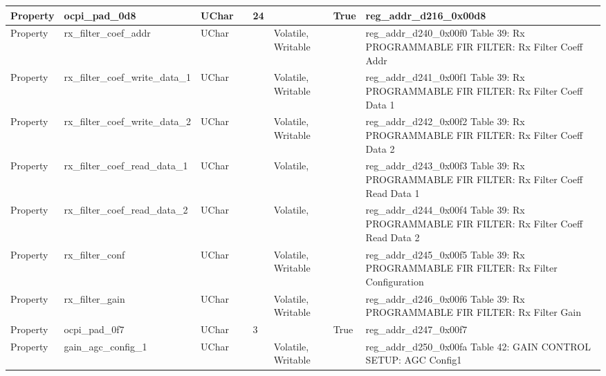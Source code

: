 \documentclass{article}
\begin{document}
\begin{scriptsize}
\begin{longtable}{|p{2cm}|p{5cm}|p{1cm}|p{2cm}|p{2cm}|p{1.75cm}|p{1.5cm}|p{5.1cm}|}
  \hline
  Property & ocpi\_pad\_0d8                                           & UChar &                  & 24               &                     & True    & reg\_addr\_d216\_0x00d8 \\
  \hline
  Property & rx\_filter\_coef\_addr                                   & UChar &                  &                  & Volatile,  Writable &         & reg\_addr\_d240\_0x00f0 Table 39: Rx PROGRAMMABLE FIR FILTER: Rx Filter Coeff Addr \\
  \hline
  Property & rx\_filter\_coef\_write\_data\_1                         & UChar &                  &                  & Volatile,  Writable &         & reg\_addr\_d241\_0x00f1 Table 39: Rx PROGRAMMABLE FIR FILTER: Rx Filter Coeff Data 1 \\
  \hline
  Property & rx\_filter\_coef\_write\_data\_2                         & UChar &                  &                  & Volatile,  Writable &         & reg\_addr\_d242\_0x00f2 Table 39: Rx PROGRAMMABLE FIR FILTER: Rx Filter Coeff Data 2 \\
  \hline
  Property & rx\_filter\_coef\_read\_data\_1                          & UChar &                  &                  & Volatile,           &         & reg\_addr\_d243\_0x00f3 Table 39: Rx PROGRAMMABLE FIR FILTER: Rx Filter Coeff Read Data 1 \\
  \hline
  Property & rx\_filter\_coef\_read\_data\_2                          & UChar &                  &                  & Volatile,           &         & reg\_addr\_d244\_0x00f4 Table 39: Rx PROGRAMMABLE FIR FILTER: Rx Filter Coeff Read Data 2 \\
  \hline
  Property & rx\_filter\_conf                                         & UChar &                  &                  & Volatile,  Writable &         & reg\_addr\_d245\_0x00f5 Table 39: Rx PROGRAMMABLE FIR FILTER: Rx Filter Configuration \\
  \hline
  Property & rx\_filter\_gain                                         & UChar &                  &                  & Volatile,  Writable &         & reg\_addr\_d246\_0x00f6 Table 39: Rx PROGRAMMABLE FIR FILTER: Rx Filter Gain \\
  \hline
  Property & ocpi\_pad\_0f7                                           & UChar &                  & 3                &                     & True    & reg\_addr\_d247\_0x00f7 \\
  \hline
  Property & gain\_agc\_config\_1                                     & UChar &                  &                  & Volatile,  Writable &         & reg\_addr\_d250\_0x00fa Table 42: GAIN CONTROL SETUP: AGC Config1 \\

\end{longtable}
\end{scriptsize}
\end{document}
